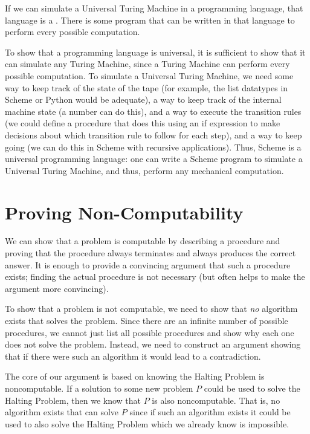 \begin{schemeregion}
If we can simulate a Universal Turing Machine in a programming language, that language is a .  There is some program that can be written in that language to perform every possible computation.  

To show that a programming language is universal, it is sufficient to show that it can simulate any Turing Machine, since a Turing Machine can perform every possible computation.  To simulate a Universal Turing Machine, we need some way to keep track of the state of the tape (for example, the list datatypes in Scheme or Python would be adequate), a way to keep track of the internal machine state (a number can do this), and a way to execute the transition rules (we could define a procedure that does this using an if expression to make decisions about which transition rule to follow for each step), and a way to keep going (we can do this in Scheme with recursive applications).  Thus, Scheme is a universal programming language: one can write a Scheme program to simulate a Universal Turing Machine, and thus, perform any mechanical computation.

\section{Proving Non-Computability}\label{sec:noncomputability}

We can show that a problem is computable by describing a procedure and proving that the procedure always terminates and always produces the correct answer.  It is enough to provide a convincing argument that such a procedure exists; finding the actual procedure is not necessary (but often helps to make the argument more convincing).  

To show that a problem is not computable, we need to show that \emph{no} algorithm exists that solves the problem.  Since there are an infinite number of possible procedures, we cannot just list all possible procedures and show why each one does not solve the problem.  Instead, we need to construct an argument showing that if there were such an algorithm it would lead to a contradiction.  

The core of our argument is based on knowing the Halting Problem is noncomputable.  If a solution to some new problem $P$ could be used to solve the Halting Problem, then we know that $P$ is also noncomputable.  That is, no algorithm exists that can solve $P$ since if such an algorithm exists it could be used to also solve the Halting Problem which we already know is impossible.  


\end{schemeregion}
